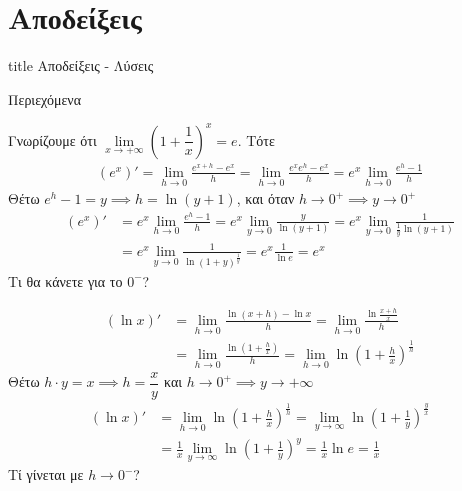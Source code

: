 \documentclass{presentation}
\begin{document}
\appendix
\section*{Αποδείξεις}

\begin{frame}[noframenumbering]
  \vfill
  \centering
  \begin{beamercolorbox}[sep=8pt,center,shadow=true,rounded=true]{title}
    Αποδείξεις - Λύσεις
  \end{beamercolorbox}
  \vfill
\end{frame}

\begin{frame}{Περιεχόμενα }
  \tableofcontents
\end{frame}

\begin{apodiksi}[$(e^x)'=e^x$]
  Γνωρίζουμε ότι $\lim\limits_{x \to +\infty}{ \left( 1+\dfrac{1}{x} \right)^x  }=e$. Τότε
  \begin{align*}
    (e^x)'=\lim\limits_{h \to 0}{ \frac{e^{x+h}-e^x}{h} }=\lim\limits_{h \to 0}{ \frac{e^xe^h-e^x}{h} }
    =e^x\lim\limits_{h \to 0}{ \frac{e^h-1}{h} }
  \end{align*}
  Θέτω $e^h-1=y\implies h=\ln (y+1)$, και όταν $h\to 0^+\implies y\to 0^+$
  \begin{align*}
    (e^x)' & =e^x\lim\limits_{h \to 0}{ \frac{e^h-1}{h} }
    =e^x\lim\limits_{y \to 0}{ \frac{y}{\ln(y+1)} }
    =e^x\lim\limits_{y \to 0}{ \frac{1}{\frac{1}{y}\ln(y+1)} }             \\
           & =e^x\lim\limits_{y \to 0}{ \frac{1}{\ln(1+y)^{\frac{1}{y}}} }
    =e^x \frac{1}{\ln e }=e^x
  \end{align*}
  Τι θα κάνετε για το $0^-$?

  \hyperlink{Θεωρία}{}
\end{apodiksi}

\begin{apodiksi}[$(\ln x)'=\frac{1}{x}$]
  \begin{align*}
    (\ln x)' & =\lim\limits_{h \to 0}{ \frac{\ln (x+h) - \ln x}{h}}=\lim\limits_{h \to 0}{ \frac{\ln \frac{x+h}{x}}{h}}         \\
             & =\lim\limits_{h \to 0}{ \frac{\ln (1+\frac{h}{x})}{h}}=\lim\limits_{h \to 0}{ \ln (1+\frac{h}{x})^{\frac{1}{h}}}
  \end{align*}
  Θέτω $h\cdot y=x\implies h=\dfrac{x}{y}$ και $h\to 0^+ \implies y\to +\infty$
  \begin{align*}
    (\ln x)' & =\lim\limits_{h \to 0}{ \ln (1+\frac{h}{x})^{\frac{1}{h}}}=\lim\limits_{y \to \infty}{ \ln (1+\frac{1}{y})^{\frac{y}{x}}} \\
             & =\frac{1}{x}\lim\limits_{y \to \infty}{ \ln (1+\frac{1}{y})^y}=\frac{1}{x}\ln e=\frac{1}{x}
  \end{align*}
  Τί γίνεται με $h\to 0^-$?
  \hyperlink{Θεωρία}{}
\end{apodiksi}
\end{document}
